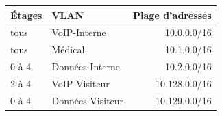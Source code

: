     \begin{center}
        \begin{tabular}{|l|l|r|}
          \hline
            Étages  &   VLAN    &   Plage d'adresses \\
          \hline
            tous    &   VoIP-Interne    &   10.0.0.0/16 \\
          \hline
            tous    &   Médical         &   10.1.0.0/16 \\
          \hline
            0 à 4   &   Données-Interne &   10.2.0.0/16 \\
          \hline
            2 à 4   &   VoIP-Visiteur   &   10.128.0.0/16 \\
          \hline
            0 à 4   &  Données-Visiteur &   10.129.0.0/16 \\
          \hline
        \end{tabular}
    \end{center}

%
%

